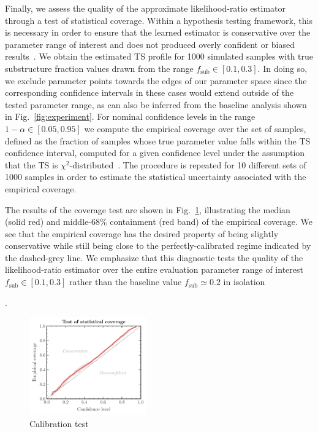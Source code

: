 \documentclass[twocolumn,linenumbers,anonymous]{aastex631}
\newcommand{\changes}[1]{{{\color{red}#1}}}
\begin{document}
\changes{Finally, we assess the quality of the approximate likelihood-ratio estimator through a test of statistical coverage. Within a hypothesis testing framework, this is necessary in order to ensure that the learned estimator is conservative over the parameter range of interest and does not produced overly confident or biased results~\citep{hermans2021averting}. We obtain the estimated TS profile for 1000 simulated samples with true substructure fraction values drawn from the range $f_\mathrm{sub}\in[0.1, 0.3]$. In doing so, we exclude parameter points towards the edges of our parameter space since the corresponding confidence intervals in these cases would extend outside of the tested parameter range, as can also be inferred from the baseline analysis shown in Fig.~\ref{fig:experiment}. For nominal confidence levels in the range $1-\alpha\in[0.05, 0.95]$ we compute the empirical coverage over the set of samples, defined as the fraction of samples whose true parameter value falls within the TS confidence interval, computed for a given confidence level under the assumption that the TS is $\chi^2$-distributed~\citep{10.1214/aoms/1177732360}. The procedure is repeated for 10 different sets of 1000 samples in order to estimate the statistical uncertainty associated with the empirical coverage.

The results of the coverage test are shown in Fig.~\ref{fig:coverage}, illustrating the median (solid red) and middle-68\% containment (red band) of the empirical coverage. We see that the empirical coverage has the desired property of being slightly conservative while still being close to the perfectly-calibrated regime indicated by the dashed-grey line. We emphasize that this diagnostic tests the quality of the likelihood-ratio estimator over the entire evaluation parameter range of interest $f_\mathrm{sub}\in[0.1, 0.3]$ rather than the baseline value $f_\mathrm{sub}\simeq0.2$ in isolation}.

\begin{figure}[!htbp]
\centering
\includegraphics[width=0.45\textwidth]{coverage}
\caption{\changes{Calibration test}}
\label{fig:coverage}
\end{figure}
    
\end{document}
